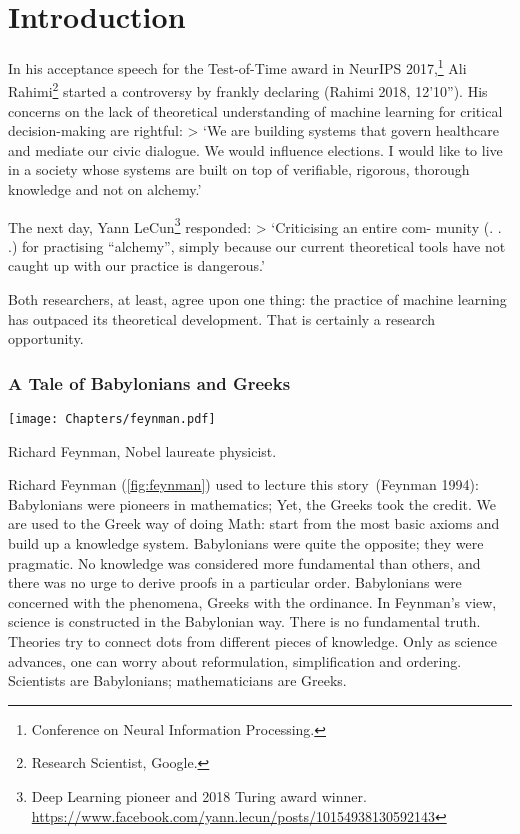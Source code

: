 \documentclass[
  letterpaper,
]{tufte-book}
\begin{document}

\hypertarget{ch:introduction}{%
\chapter{Introduction}\label{ch:introduction}}

In his acceptance speech for the Test-of-Time award in NeurIPS
2017,\footnote{Conference on Neural Information Processing.} Ali
Rahimi\footnote{Research Scientist, Google.} started a controversy by
frankly declaring (Rahimi 2018, 12'10''). His concerns on the lack of
theoretical understanding of machine learning for critical
decision-making are rightful: \textgreater{} \textbar{} `We are building
systems that govern healthcare and mediate our civic dialogue. We would
influence elections. I would like to live in a society whose systems are
built on top of verifiable, rigorous, thorough knowledge and not on
alchemy.'

The next day, Yann LeCun\footnote{Deep Learning pioneer and 2018 Turing
  award winner.
  \url{https://www.facebook.com/yann.lecun/posts/10154938130592143}}
responded: \textgreater{} \textbar{} `Criticising an entire com- munity
(. . .) for practising ``alchemy'', simply because our current
theoretical tools have not caught up with our practice is dangerous.'

Both researchers, at least, agree upon one thing: the practice of
machine learning has outpaced its theoretical development. That is
certainly a research opportunity.

\hypertarget{sec:greeks}{%
\subsection{A Tale of Babylonians and Greeks}\label{sec:greeks}}

\begin{marginfigure}

{\centering \texttt{[image: Chapters/feynman.pdf]}

}

\caption{\label{fig-feynman}Richard Feynman, Nobel laureate physicist.}

\end{marginfigure}

Richard Feynman (\protect\hyperlink{fig:feynman}{{[}fig:feynman{]}})
used to lecture this story~(Feynman 1994): Babylonians were pioneers in
mathematics; Yet, the Greeks took the credit. We are used to the Greek
way of doing Math: start from the most basic axioms and build up a
knowledge system. Babylonians were quite the opposite; they were
pragmatic. No knowledge was considered more fundamental than others, and
there was no urge to derive proofs in a particular order. Babylonians
were concerned with the phenomena, Greeks with the ordinance. In
Feynman's view, science is constructed in the Babylonian way. There is
no fundamental truth. Theories try to connect dots from different pieces
of knowledge. Only as science advances, one can worry about
reformulation, simplification and ordering. Scientists are Babylonians;
mathematicians are Greeks.
\end{document}

